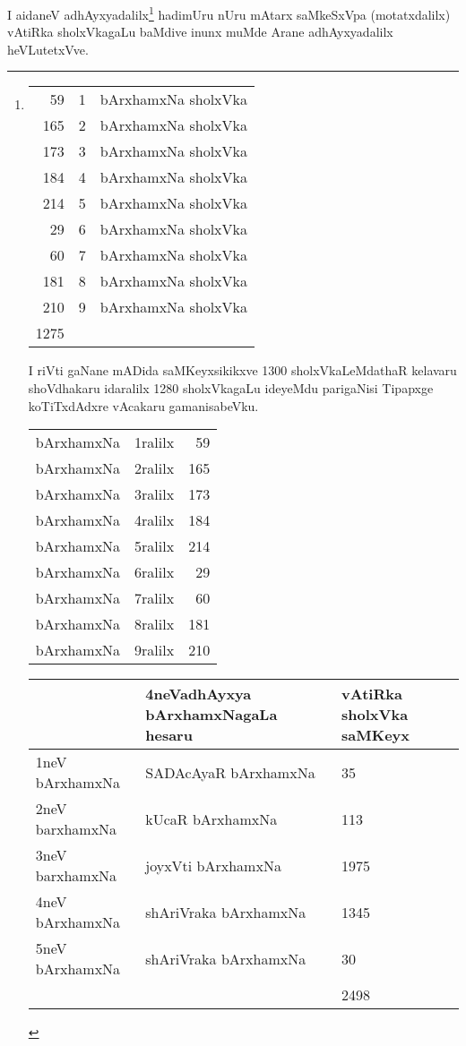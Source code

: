 \begin{artha}
I aidaneV adhAyxyadalilx\footnote[1]{
\begin{tabular}{rll}
59 &1 & bArxhamxNa sholxVka\\
165 & 2 & bArxhamxNa sholxVka\\
173 & 3 & bArxhamxNa sholxVka\\
184 & 4 & bArxhamxNa sholxVka\\
214 & 5 & bArxhamxNa sholxVka\\
29 & 6 & bArxhamxNa sholxVka\\
60 & 7 & bArxhamxNa sholxVka\\
181 & 8 & bArxhamxNa sholxVka\\
210 & 9 & bArxhamxNa sholxVka\\
\hline
1275
\end{tabular}

I riVti gaNane mADida saMKeyxsikikxve
1300 sholxVkaLeMdathaR kelavaru shoVdhakaru idaralilx 1280 sholxVkagaLu ideyeMdu parigaNisi Tipapxge koTiTxdAdxre vAcakaru gamanisabeVku.

\begin{tabular}{lrr}
bArxhamxNa & 1ralilx & 59\\
bArxhamxNa & 2ralilx & 165\\
bArxhamxNa & 3ralilx & 173\\
bArxhamxNa & 4ralilx & 184\\
bArxhamxNa & 5ralilx & 214\\
bArxhamxNa & 6ralilx & 29\\
bArxhamxNa & 7ralilx & 60\\
bArxhamxNa & 8ralilx & 181\\
bArxhamxNa & 9ralilx & 210
\end{tabular}


\begin{tabular}{|l|l|l|}
\hline
& 4neVadhAyxya bArxhamxNagaLa hesaru & vAtiRka sholxVka saMKeyx\\
\hline
1neV bArxhamxNa & SADAcAyaR bArxhamxNa & 35\\
2neV barxhamxNa & kUcaR bArxhamxNa & 113\\
3neV barxhamxNa & joyxVti bArxhamxNa & 1975\\
4neV bArxhamxNa & shAriVraka bArxhamxNa & 1345\\
5neV bArxhamxNa & shAriVraka bArxhamxNa & 30\\
\hline
& &  2498\\
\hline
\end{tabular}

} hadimUru nUru mAtarx saMkeSxVpa (motatxdalilx) vAtiRka sholxVkagaLu baMdive inunx muMde Arane adhAyxyadalilx heVLutetxVve.
\end{artha}

